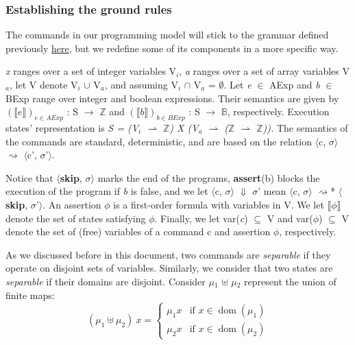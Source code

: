 \FloatBarrier
\subsubsection{Establishing the ground rules} 
\label{subsubsec:product_programs_ground_rules}

The commands in our programming model will stick to the grammar defined previously \hyperref[sub:relational_hoare_logic_formal_proof_rules]{here}, but we redefine some of its components in a more specific way.

\emph{x} ranges over a set of integer variables V$_i$, \emph{a} ranges over a set of array variables V$_a$, let V denote V$_i$ $\cup$ V$_a$, and assuming V$_i$ $\cap$ V$_a$ = $\emptyset$.
Let \emph{e} $\in$ AExp and \emph{b} $\in$ BExp range over integer and boolean expressions.
Their semantics are given by ${(\llbracket e \rrbracket)}_{e \in AExp}$ : S $\rightarrow$ $\mathbb{Z}$ and ${(\llbracket b \rrbracket)}_{b \in BExp}$ : S $\rightarrow$ $\mathbb{B}$, respectively.
Execution states' representation is \emph{S = (V$_i$ $\rightharpoonup$ $\mathbb{Z}$) X (V$_a$ $\rightharpoonup$ ($\mathbb{Z}$ $\rightharpoonup$ $\mathbb{Z}$)).}
The semantics of the commands are standard, deterministic, and are based on the relation $\langle$c, $\sigma$$\rangle$ $\rightsquigarrow$ $\langle$c', $\sigma$'$\rangle$.

Notice that $\langle$\textbf{skip}, $\sigma$$\rangle$ marks the end of the programs, \textbf{assert}(b) blocks the execution of the program if \emph{b} is false, and we let $\langle$c, $\sigma$$\rangle$ $\Downarrow$ $\sigma$' mean $\langle$c, $\sigma$$\rangle$ $\rightsquigarrow$* $\langle$\textbf{skip}, $\sigma$'$\rangle$.
An assertion $\phi$ is a first-order formula with variables in V.
We let $\llbracket\phi\rrbracket$ denote the set of states satisfying $\phi$.
Finally, we let var(\emph{c}) $\subseteq$ V and var($\phi$) $\subseteq$ V denote the set of (free) variables of a command c and assertion $\phi$, respectively.

As we discussed before in this document, two commands are \emph{separable} if they operate on disjoint sets of variables.
Similarly, we consider that two states are \emph{separable} if their domains are disjoint.
Consider $\mu$$_1$ $\uplus$ $\mu$$_2$ represent the union of finite maps:
\[
(\mu_1 \uplus \mu_2) \ x =
\begin{cases}
    \mu_1 x & \text{if } x \in \operatorname{dom}(\mu_1) \\
    \mu_2 x & \text{if } x \in \operatorname{dom}(\mu_2)
\end{cases}
\]

